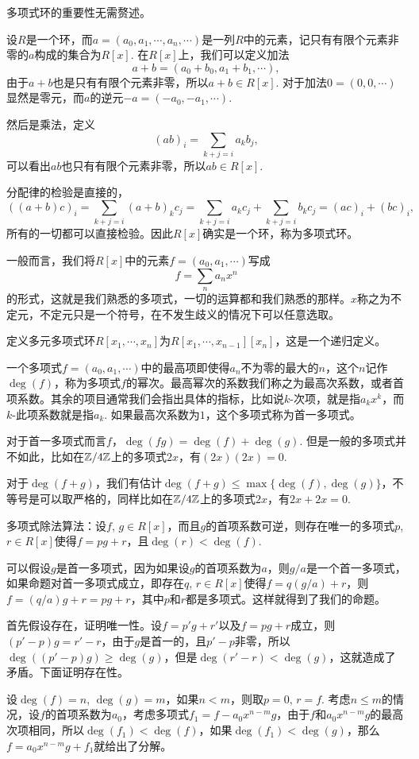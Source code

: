 多项式环的重要性无需赘述。

\para 设$R$是一个环，而$a=(a_0,a_1,\cdots,a_n,\cdots)$是一列$R$中的元素，记只有有限个元素非零的$a$构成的集合为$R[x]$. 在$R[x]$上，我们可以定义加法
\[
	a+b=(a_0+b_0,a_1+b_1,\cdots),
\]
由于$a+b$也是只有有限个元素非零，所以$a+b \in R[x]$. 对于加法$0=(0,0,\cdots)$显然是零元，而$a$的逆元$-a=(-a_0,-a_1,\cdots)$.

然后是乘法，定义
\[
	(ab)_i=\sum_{k+j=i}a_kb_j,
\]
可以看出$ab$也只有有限个元素非零，所以$ab\in R[x]$.

分配律的检验是直接的，
\[
	((a+b)c)_i=\sum_{k+j=i}(a+b)_kc_j=\sum_{k+j=i}a_kc_j+\sum_{k+j=i}b_kc_j=(ac)_i+(bc)_i,
\]
所有的一切都可以直接检验。因此$R[x]$确实是一个环，称为多项式环。

一般而言，我们将$R[x]$中的元素$f=(a_0,a_1,\cdots)$写成
\[
	f=\sum_{n}a_n x^n
\]
的形式，这就是我们熟悉的多项式，一切的运算都和我们熟悉的那样。$x$称之为不定元，不定元只是一个符号，在不发生歧义的情况下可以任意选取。

\para 定义多元多项式环$R[x_1,\cdots,x_n]$为$R[x_1,\cdots,x_{n-1}][x_n]$，这是一个递归定义。

\para 一个多项式$f=(a_0,a_1,\cdots)$中的最高项即使得$a_n$不为零的最大的$n$，这个$n$记作$\deg(f)$，称为多项式$f$的幂次。最高幂次的系数我们称之为最高次系数，或者首项系数。其余的项目通常我们会指出具体的指标，比如说$k$-次项，就是指$a_kx^k$，而$k$-此项系数就是指$a_k$. 如果最高次系数为$1$，这个多项式称为首一多项式。

对于首一多项式而言$f$，$\deg(fg)=\deg(f)+\deg(g)$. 但是一般的多项式并不如此，比如在$\mathbb{Z}/4\mathbb{Z}$上的多项式$2x$，有$(2x)(2x)=0$.

对于$\deg(f+g)$，我们有估计$\deg(f+g)\leq \max\{\deg(f),\deg(g)\}$，不等号是可以取严格的，同样比如在$\mathbb{Z}/4\mathbb{Z}$上的多项式$2x$，有$2x+2x=0$.

\theo 多项式除法算法：设$f$, $g\in R[x]$，而且$g$的首项系数可逆，则存在唯一的多项式$p$, $r\in R[x]$使得$f=pg+r$，且$\deg(r)< \deg(f)$.

\proof
	可以假设$g$是首一多项式，因为如果设$g$的首项系数为$a$，则$g/a$是一个首一多项式，如果命题对首一多项式成立，即存在$q$, $r\in R[x]$使得$f=q(g/a)+r$，则$f=(q/a)g+r=pg+r$，其中$p$和$r$都是多项式。这样就得到了我们的命题。

	首先假设存在，证明唯一性。设$f=p'g+r'$以及$f=pg+r$成立，则$(p'-p)g=r'-r$，由于$g$是首一的，且$p'-p$非零，所以$\deg((p'-p)g)\geq \deg(g)$，但是$\deg(r'-r)< \deg(g)$，这就造成了矛盾。下面证明存在性。

	设$\deg(f)=n$, $\deg(g)=m$，如果$n<m$，则取$p=0$, $r=f$. 考虑$n\leq m$的情况，设$f$的首项系数为$a_0$，考虑多项式$f_1=f-a_0x^{n-m}g$，由于$f$和$a_0x^{n-m}g$的最高次项相同，所以$\deg(f_1)<\deg(f)$，如果$\deg(f_1)<\deg(g)$，那么$f=a_0x^{n-m}g+f_1$就给出了分解。

